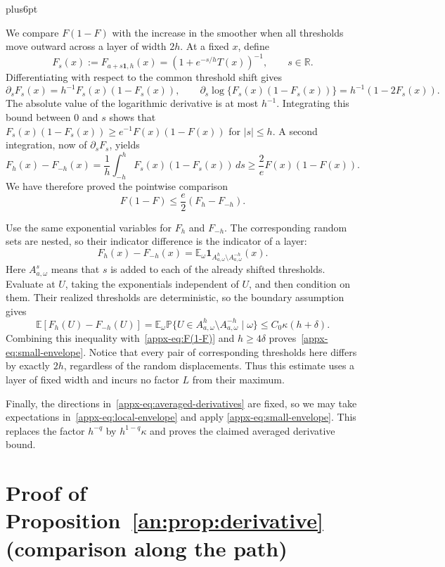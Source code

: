 \documentclass[11pt,letterpaper,twoside,leqno]{article}
\makeatletter
\theoremstyle{bookplain}
\theoremstyle{bookremark}
\renewenvironment{proof}[1][\proofname]{\par
  \pushQED{\qed}\normalfont\topsep6pt plus6pt\relax
  \trivlist\item[\hskip\labelsep\bfseries #1\@addpunct{.}]\ignorespaces
}{\popQED\endtrivlist\@endpefalse}
\newcommand{\E}{\mathbb E}
\newcommand{\Pp}{\mathbb P}
\newcommand{\R}{\mathbb R}
\newcommand{\ind}{\mathbf 1}
\makeatother
\begin{document}
\begin{proof}
We compare $F(1-F)$ with the increase in the smoother when all
thresholds move outward across a layer of width $2h$. At a fixed
$x$, define
\[
 F_s(x):=F_{a+s\mathbf1,h}(x)
       =(1+e^{-s/h}T(x))^{-1},\qquad s\in\R.
\]
Differentiating with respect to the common threshold shift gives
\[
 \partial_sF_s(x)=h^{-1}F_s(x)(1-F_s(x)),
 \qquad
 \partial_s\log\{F_s(x)(1-F_s(x))\}
       =h^{-1}(1-2F_s(x)).
\]
The absolute value of the logarithmic derivative is at most $h^{-1}$.
Integrating this bound between $0$ and $s$ shows that
$F_s(x)(1-F_s(x))\ge e^{-1}F(x)(1-F(x))$ for $|s|\le h$.
A second integration, now of $\partial_sF_s$, yields
\[
 F_h(x)-F_{-h}(x)
 =\frac1h\int_{-h}^h F_s(x)(1-F_s(x))\,ds
 \ge\frac2e F(x)(1-F(x)).
\]
We have therefore proved the pointwise comparison
\begin{equation}\label{appx-eq:F(1-F)}
 F(1-F)\le\frac e2(F_h-F_{-h}).
\end{equation}

Use the same exponential variables for $F_h$ and $F_{-h}$.
The corresponding random sets are nested, so their indicator
difference is the indicator of a layer:
\[
 F_h(x)-F_{-h}(x)
 =\E_\omega\ind_{A_{a,\omega}^h\setminus
                         A_{a,\omega}^{-h}}(x).
\]
Here $A_{a,\omega}^s$ means that $s$ is added to each of the
already shifted thresholds. Evaluate at $U$, taking the exponentials
independent of $U$, and then condition on them. Their realized
thresholds are deterministic, so the boundary assumption gives
\[
 \E[F_h(U)-F_{-h}(U)]
 =\E_\omega\Pp\{U\in A_{a,\omega}^h\setminus
                        A_{a,\omega}^{-h}\mid\omega\}
 \le C_0\kappa(h+\delta).
\]
Combining this inequality with~\eqref{appx-eq:F(1-F)} and
$h\ge4\delta$ proves~\eqref{appx-eq:small-envelope}.
Notice that every pair of corresponding thresholds here differs
by exactly $2h$, regardless of the random displacements.
Thus this estimate uses a layer of fixed width and incurs no factor
$L$ from their maximum.

Finally, the directions in~\eqref{appx-eq:averaged-derivatives}
are fixed, so we may take expectations
in~\eqref{appx-eq:local-envelope} and apply
\eqref{appx-eq:small-envelope}. This replaces the factor $h^{-q}$
by $h^{1-q}\kappa$ and proves the claimed averaged derivative bound.
\end{proof}


\section{Proof of Proposition~\ref*{an:prop:derivative} (comparison along the path)}
\label{appx-sec:support}
\end{document}
